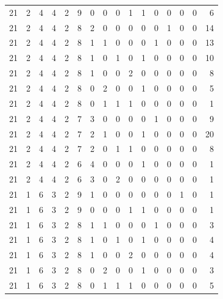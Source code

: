 \begin{appendix}
{\begin{longtable}{lrrrrrrrrrrrrrrr}
    21        & 2  & 4  & 4  & 2  & 9  & 0  & 0  & 0  & 1  & 1  & 0  & 0   & 0   & 0   & 6    \\
    21        & 2  & 4  & 4  & 2  & 8  & 2  & 0  & 0  & 0  & 0  & 0  & 1   & 0   & 0   & 14   \\
    21        & 2  & 4  & 4  & 2  & 8  & 1  & 1  & 0  & 0  & 0  & 1  & 0   & 0   & 0   & 13   \\
    21        & 2  & 4  & 4  & 2  & 8  & 1  & 0  & 1  & 0  & 1  & 0  & 0   & 0   & 0   & 10   \\
    21        & 2  & 4  & 4  & 2  & 8  & 1  & 0  & 0  & 2  & 0  & 0  & 0   & 0   & 0   & 8    \\
    21        & 2  & 4  & 4  & 2  & 8  & 0  & 2  & 0  & 0  & 1  & 0  & 0   & 0   & 0   & 5    \\
    21        & 2  & 4  & 4  & 2  & 8  & 0  & 1  & 1  & 1  & 0  & 0  & 0   & 0   & 0   & 1    \\
    21        & 2  & 4  & 4  & 2  & 7  & 3  & 0  & 0  & 0  & 0  & 1  & 0   & 0   & 0   & 9    \\
    21        & 2  & 4  & 4  & 2  & 7  & 2  & 1  & 0  & 0  & 1  & 0  & 0   & 0   & 0   & 20   \\
    21        & 2  & 4  & 4  & 2  & 7  & 2  & 0  & 1  & 1  & 0  & 0  & 0   & 0   & 0   & 8    \\
    21        & 2  & 4  & 4  & 2  & 6  & 4  & 0  & 0  & 0  & 1  & 0  & 0   & 0   & 0   & 1    \\
    21        & 2  & 4  & 4  & 2  & 6  & 3  & 0  & 2  & 0  & 0  & 0  & 0   & 0   & 0   & 1    \\
    21        & 1  & 6  & 3  & 2  & 9  & 1  & 0  & 0  & 0  & 0  & 0  & 0   & 1   & 0   & 1    \\
    21        & 1  & 6  & 3  & 2  & 9  & 0  & 0  & 0  & 1  & 1  & 0  & 0   & 0   & 0   & 1    \\
    21        & 1  & 6  & 3  & 2  & 8  & 1  & 1  & 0  & 0  & 0  & 1  & 0   & 0   & 0   & 3    \\
    21        & 1  & 6  & 3  & 2  & 8  & 1  & 0  & 1  & 0  & 1  & 0  & 0   & 0   & 0   & 4    \\
    21        & 1  & 6  & 3  & 2  & 8  & 1  & 0  & 0  & 2  & 0  & 0  & 0   & 0   & 0   & 4    \\
    21        & 1  & 6  & 3  & 2  & 8  & 0  & 2  & 0  & 0  & 1  & 0  & 0   & 0   & 0   & 3    \\
    21        & 1  & 6  & 3  & 2  & 8  & 0  & 1  & 1  & 1  & 0  & 0  & 0   & 0   & 0   & 5    \\

\end{longtable}}
\end{appendix}
